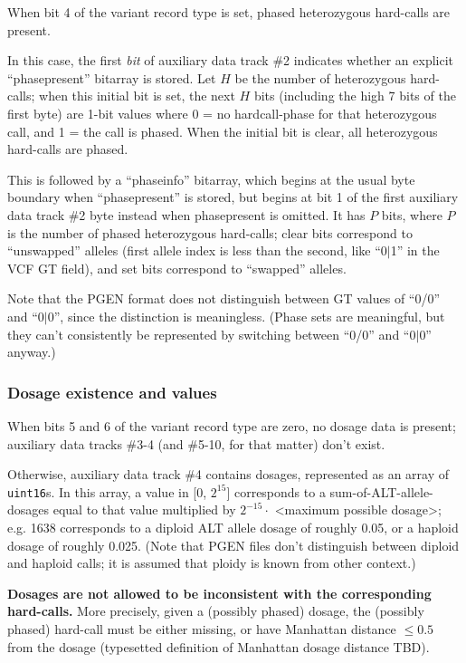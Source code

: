 \documentclass[8pt]{article}
\begin{document}
When bit 4 of the variant record type is set, phased heterozygous hard-calls
are present.

In this case, the first \textit{bit} of auxiliary data track \#2 indicates
whether an explicit ``phasepresent'' bitarray is stored.  Let $H$ be the number
of heterozygous hard-calls; when this initial bit is set, the next $H$ bits
(including the high 7 bits of the first byte) are 1-bit values where 0 = no
hardcall-phase for that heterozygous call, and 1 = the call is phased.  When
the initial bit is clear, all heterozygous hard-calls are phased.

This is followed by a ``phaseinfo'' bitarray, which begins at the usual byte
boundary when ``phasepresent'' is stored, but begins at bit 1 of the first
auxiliary data track \#2 byte instead when phasepresent is omitted.  It has $P$
bits, where $P$ is the number of phased heterozygous hard-calls; clear bits
correspond to ``unswapped'' alleles (first allele index is less than the
second, like ``0$|$1'' in the VCF GT field), and set bits correspond to
``swapped'' alleles.

Note that the PGEN format does not distinguish between GT values of ``0/0'' and
``0$|$0'', since the distinction is meaningless.  (Phase sets are meaningful,
but they can't consistently be represented by switching between ``0/0'' and
``0$|$0'' anyway.)

\subsubsection{Dosage existence and values}

When bits 5 and 6 of the variant record type are zero, no dosage data is
present; auxiliary data tracks \#3-4 (and \#5-10, for that matter) don't exist.

Otherwise, auxiliary data track \#4 contains dosages, represented as an array
of \texttt{uint16}s.  In this array, a value in [0, $2^{15}$] corresponds to a
sum-of-ALT-allele-dosages equal to that value multiplied by $2^{-15}\cdot $
\textless maximum possible dosage\textgreater ; e.g. 1638 corresponds to a
diploid ALT allele dosage of roughly 0.05, or a haploid dosage of roughly
0.025.  (Note that PGEN files don't distinguish between diploid and haploid
calls; it is assumed that ploidy is known from other context.)

\textbf{Dosages are not allowed to be inconsistent with the corresponding
hard-calls.}  More precisely, given a (possibly phased) dosage, the (possibly
phased) hard-call must be either missing, or have Manhattan distance $\leq 0.5$
from the dosage (typesetted definition of Manhattan dosage distance TBD).
\end{document}
